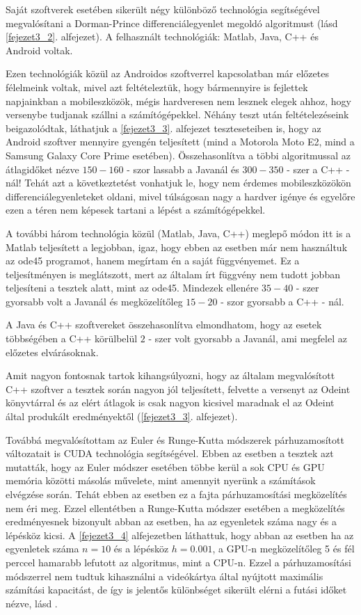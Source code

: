 Saját szoftverek esetében sikerült négy különböző technológia segítségével megvalósítani a Dorman-Prince differenciálegyenlet megoldó algoritmust (lásd \ref{fejezet3_2}. alfejezet). A felhasznált technológiák: Matlab, Java, C++ és Android voltak.

Ezen technológiák közül az Androidos szoftverrel kapcsolatban már előzetes félelmeink voltak, mivel azt feltételeztük, hogy bármennyire is fejlettek napjainkban a mobileszközök, mégis hardveresen nem lesznek elegek ahhoz, hogy versenybe tudjanak szállni a számítógépekkel. Néhány teszt után feltételezéseink beigazolódtak, láthatjuk a \ref{fejezet3_3}. alfejezet teszteseteiben is, hogy az Android szoftver mennyire gyengén teljesített (mind a Motorola Moto E2, mind a Samsung Galaxy Core Prime esetében). Összehasonlítva a többi algoritmussal az átlagidőket nézve $ 150-160 $ - szor lassabb a Javanál és $ 300 - 350 $ - szer a C++ - nál! Tehát azt a következtetést vonhatjuk le, hogy nem érdemes mobileszközökön differenciálegyenleteket oldani, mivel túlságosan nagy a hardver igénye és egyelőre ezen a téren nem képesek tartani a lépést a számítógépekkel.

A további három technológia közül (Matlab, Java, C++) meglepő módon itt is a Matlab teljesített a legjobban, igaz, hogy ebben az esetben már nem használtuk az ode45 programot, hanem megírtam én a saját függvényemet. Ez a teljesítményen is meglátszott, mert az általam írt függvény nem tudott jobban teljesíteni a tesztek alatt, mint az ode45. Mindezek ellenére $ 35-40 $ - szer gyorsabb volt a Javanál és megközelítőleg $ 15-20 $ - szor gyorsabb a C++ - nál.

A Java és C++ szoftvereket összehasonlítva elmondhatom, hogy az esetek többségében a C++ körülbelül $ 2 $ - szer volt gyorsabb a Javanál, ami megfelel az előzetes elvárásoknak.

Amit nagyon fontosnak tartok kihangsúlyozni, hogy az általam megvalósított C++ szoftver a tesztek során nagyon jól teljesített, felvette a versenyt az Odeint könyvtárral és az elért átlagok is csak nagyon kicsivel maradnak el az Odeint által produkált eredményektől (\ref{fejezet3_3}. alfejezet).

Továbbá megvalósítottam az Euler és Runge-Kutta módszerek párhuzamosított változatait is CUDA technológia segítségével. Ebben az esetben a tesztek azt mutatták, hogy az Euler módszer esetében többe kerül a sok CPU és GPU memória közötti másolás művelete, mint amennyit nyerünk a számítások elvégzése során. Tehát ebben az esetben ez a fajta párhuzamosítási megközelítés nem éri meg. Ezzel ellentétben a Runge-Kutta módszer esetében a megközelítés eredményesnek bizonyult abban az esetben, ha az egyenletek száma nagy és a lépésköz kicsi. A \ref{fejezet3_4} alfejezetben láthattuk, hogy abban az esetben ha az egyenletek száma $ n = 10 $ és a lépésköz $ h = 0.001 $, a GPU-n megközelítőleg 5 és fél perccel hamarabb lefutott az algoritmus, mint a CPU-n. Ezzel a párhuzamosítási módszerrel nem tudtuk kihasználni a videókártya által nyújtott maximális számítási kapacitást, de így is jelentős különbséget sikerült elérni a futási időket nézve, l\'asd \cite{Katai}.



